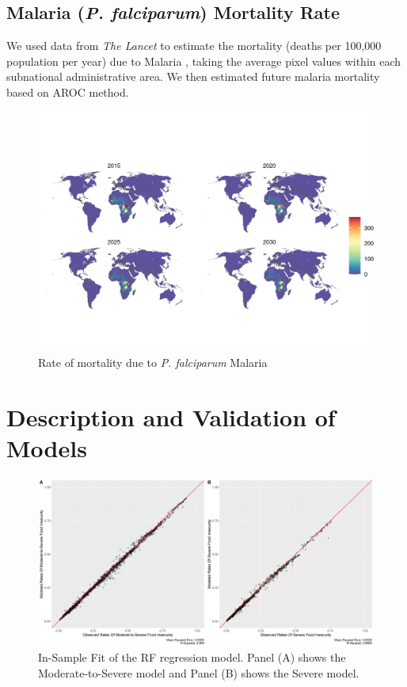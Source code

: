 \documentclass{article}
\begin{document}
\subsection{Malaria (\textit{P. falciparum}) Mortality Rate}
We used data from \textit{The Lancet} to estimate the mortality (deaths per 100,000 population per year) due to Malaria \citep{Weiss2019}, taking the average pixel values within each subnational administrative area.  We then estimated future malaria mortality based on AROC method.

\begin{figure}[H]
  \centering
  \includegraphics[width=\linewidth]{img/covars/mal_falciparum.png}
  \caption{Rate of mortality due to \textit{P. falciparum} Malaria}
\end{figure}

\section{Description and Validation of Models}

\begin{figure}[H]
  \centering
  \includegraphics[width=\linewidth]{img/model/in-sample_rf.png}
  \caption{In-Sample Fit of the RF regression model. Panel (A) shows the Moderate-to-Severe model and Panel (B) shows the Severe model.}
  \label{fig:rf_in-sample}
\end{figure}
\end{document}
